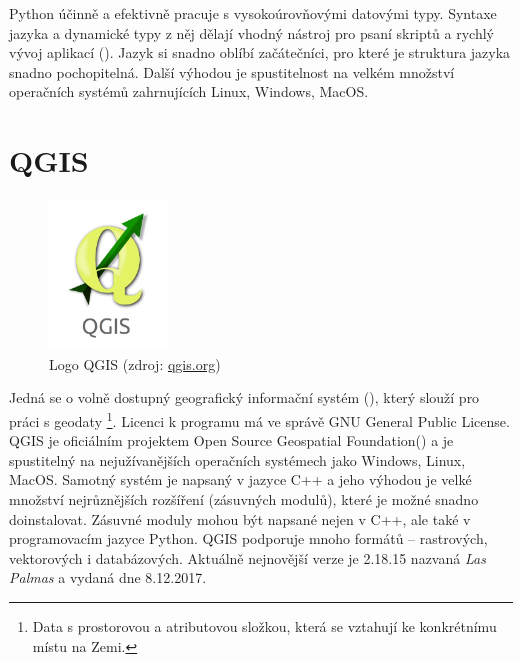 Python účinně a efektivně pracuje s vysokoúrovňovými datovými
typy. Syntaxe jazyka a dynamické typy z něj dělají vhodný nástroj pro
psaní skriptů a rychlý vývoj aplikací (). Jazyk si snadno
oblíbí začátečníci, pro které je struktura jazyka snadno pochopitelná. 
Další výhodou je spustitelnost na velkém množství operačních systémů zahrnujících Linux, Windows, MacOS. \cite{python, diveintopython}

\section{QGIS}
\label{sec:qgis}
\begin{figure}[H]
	 \centering
      \includegraphics[height=4cm]{./pictures/qgis-logo.jpg}
      \caption{Logo QGIS (zdroj:
\href{https://euipo.europa.eu/copla/image/CJ4JX4FZVCC523YA2TMALSKFLFPOWZHPVHYMP5QREVP2BOXHB3PCM7RCOZR6TEIMWNCQDAB6N25VA}{qgis.org})}
      \label{fig:qgis}
  \end{figure}
  
Jedná se o volně dostupný geografický informační systém (),
který slouží pro práci s geodaty \footnote{Data s prostorovou a atributovou složkou, která se vztahují ke konkrétnímu místu na
   Zemi.}. Licenci k programu má ve správě GNU General Public
License. QGIS je oficiálním projektem Open Source Geospatial
Foundation() a je spustitelný na nejužívanějších operačních
systémech jako Windows, Linux, MacOS. Samotný systém je napsaný v
jazyce C++ a jeho výhodou je velké množství nejrůznějších rozšíření
(zásuvných modulů), které je možné snadno doinstalovat. Zásuvné moduly
mohou být napsané nejen v C++, ale také v programovacím jazyce
Python. QGIS podporuje mnoho formátů -- rastrových,
vektorových i databázových. Aktuálně nejnovější verze je 2.18.15
nazvaná \textit{Las Palmas} a vydaná dne 8.12.2017.

